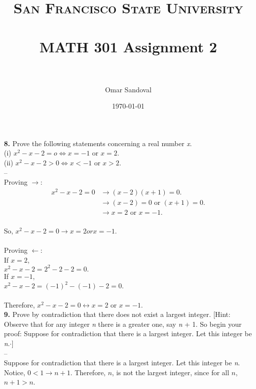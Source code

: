 \documentclass[paper=letter, fontsize=11pt]{scrartcl} %
\title{	
\normalfont \normalsize 
\textsc{San Francisco State University} \\ [25pt]
\horrule{0.5pt} \\[0.4cm] %
\huge MATH 301 Assignment 2  \\ %
\horrule{2pt} \\[0.5cm] %
}
\author{Omar Sandoval}
\date{\normalsize\today}
\begin{document}
\maketitle

\textbf{8.} Prove the following statements concerning a real number \textit{x}. \\
(i) $x^2 - x - 2 = o \Leftrightarrow x = -1$ or $x = 2$.\\
(ii) $x^2 - x - 2 > 0 \Leftrightarrow x < -1$ or $x > 2$.
\\
-- \\
Proving $\rightarrow$: \\
\begin{align*}
	x^2 - x - 2 = 0 &\rightarrow (x-2)(x+1) = 0. \\
	&\rightarrow (x-2) = 0 \text{ or } (x+1) = 0. \\
	&\rightarrow x = 2 \text{ or } x = -1. \\
\end{align*}

So, $x^2 - x - 2 = 0 \rightarrow x = 2 or x = -1.$ \\\\
Proving $\leftarrow$: \\

If $x = 2$, \\
	
	$x^2 - x - 2 = 2^2 - 2 - 2 = 0.$ \\
	
If $x = -1$, \\
	
	$x^2 - x - 2 = (-1)^2 - (-1) - 2 = 0.$ \\\\
Therefore, $x^2 - x - 2 = 0 \leftrightarrow x = 2$ or $x = -1$.\\

\textbf{9.}	Prove by contradiction that there does not exist a largest integer. [Hint: Observe that for any integer \textit{n} there is a greater one, say \textit{n} + 1. So begin your proof:  
Suppose for contradiction that there is a largest integer. Let this integer be \textit{n}.$ \cdot$]
\\
-- \\ 
Suppose for contradiction that there is a largest integer. Let this integer be \textit{n}. Notice, $0 < 1 \rightarrow n + 1$. Therefore, $n$, is not the largest integer, since for all $n$, $n + 1 > n$.\\
\end{document}

